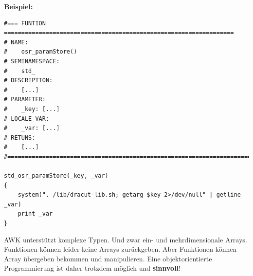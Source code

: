 \documentclass[10pt,a4paper]{article}
\begin{document}
\bigskip 
\textbf{Beispiel:}


\begin{lstlisting}
#=== FUNTION ==================================================================
# NAME:
#    osr_paramStore()
# SEMINAMESPACE:
#    std_
# DESCRIPTION:
#    [...]
# PARAMETER:
#    _key: [...]
# LOCALE-VAR:
#    _var: [...]
# RETUNS:
#    [...]
#==============================================================================

std_osr_paramStore(_key, _var)
{
    system(". /lib/dracut-lib.sh; getarg $key 2>/dev/null" | getline _var)
    print _var
}
\end{lstlisting}


AWK unterstützt komplexe Typen. Und zwar ein- und mehrdimensionale Arrays.
Funktionen können leider keine Arrays zurückgeben. Aber Funktionen können Array
übergeben bekommen und manipulieren. Eine objektorientierte
Programmierung ist daher trotzdem möglich und \textbf{sinnvoll}!

\bigskip
\end{document}
